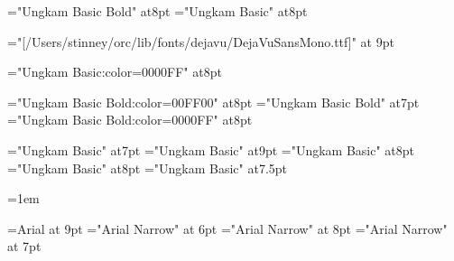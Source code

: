 

\let\seq\relax
\let\lname\relax
\let\sname\relax
\let\uname\relax
\let\chars\relax
\let\names\relax
\let\glyph\relax
\let\rglyf\relax
\let\image\relax
\let\notes\relax
\let\stags\relax

\let\sqdbcun\relax
\let\sqdbpua\relax
\let\sqseq\relax
\let\sqinv\relax
\let\sqchr\relax

\let\imagefloat\relax
\let\imagecaption\relax

\let\remfor\relax
\let\Hhhhh\relax

\let\glyf\relax
\let\fchr\relax
\let\fhex\relax
\let\dist\relax
\let\rhex\relax

\let\sl\relax
\let\slc\relax
\let\slcc\relax
\let\cdligh\relax
\let\zatu\relax
\def\diffc{\let\ofspc\relax\pcfee}
\def\diffd{\message{hvfee}\hvfee}

\font\slnmfont="Ungkam Basic Bold" at8pt
\font\sltgfont="Ungkam Basic" at8pt

\font\mono="[/Users/stinney/orc/lib/fonts/dejavu/DejaVuSansMono.ttf]" at 9pt

\font\blungkam="Ungkam Basic:color=0000FF" at8pt

\font\slnmfontw="Ungkam Basic Bold:color=00FF00" at8pt
\font\slnmfontx="Ungkam Basic Bold" at7pt
\font\slnmfonty="Ungkam Basic Bold:color=0000FF" at8pt

\font\akafont="Ungkam Basic" at7pt
\font\sldistfont="Ungkam Basic" at9pt
\font\oidfont="Ungkam Basic" at8pt
\font\oidfontx="Ungkam Basic" at8pt
\font\zatufont="Ungkam Basic" at7.5pt

\oidfont{}=1em %

\font\helv=Arial at 9pt
\font\helvx="Arial Narrow" at 6pt
\font\helvy="Arial Narrow" at 8pt
\font\helvz="Arial Narrow" at 7pt

\def\ofs#1#2#3{}
\let\ofspc\pcxxv
\let\redpc\pcfee
\let\newgh\pcblu

\long{}

\let\pageno\page

\newcount\ltfirstpage








\def\Hstrut{\vrule height12pt depth5pt width0pt}
\def\tvrule{\vrule}
\def\tvrulex{\vrule width1pt\relax}
\def\tablerule{\noalign{\allowbreak\hrule}}
\def\thead{\Sans\nine\rm}
\def\theadrule{\noalign{\hrule height1pt}}
\def\tbodybreak{\noalign{\allowbreak}}

